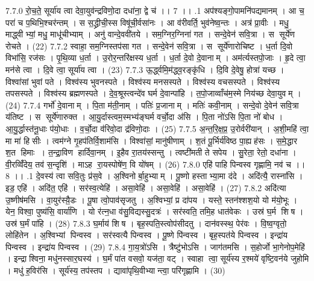 7.7.0
रो॒च॒ते॒ सूर्या॑य त्वा देवा॒युव॑न्द्रविणो॒दा दधा॑ना॒ द्वे च॑ ।। 7 ।।
.1
अप॑श्यङ्गो॒पामनि॑पद्यमानम् । आ च॒ परा॑ च प॒थिभि॒श्चर॑न्तम् । स स॒द्ध्रीची॒स्स विषू॑ची॒र्वसा॑नः । आ व॑रीवर्ति॒ भुव॑नेष्व॒न्तः । अत्र॑ प्रा॒वीः । मधु॒ माद्ध्वीभ्यां॒ मधु॒ माधू॑चीभ्याम् । अनु॑ वान्दे॒ववी॑तये । सम॒ग्निर॒ग्निना॑ गत । सन्दे॒वेन॑ सवि॒त्रा । स सूर्ये॑ण रोचते । (22)
7.7.2
स्वाहा॒ सम॒ग्निस्तप॑सा गत । सन्दे॒वेन॑ सवि॒त्रा । स सूर्ये॑णारोचिष्ट । ध॒र्ता दि॒वो विभा॑सि॒ रज॑सः । पृ॒थि॒व्या ध॒र्ता । उ॒रोर॒न्तरि॑क्षस्य ध॒र्ता । ध॒र्ता दे॒वो दे॒वानाम् । अम॑र्त्यस्तपो॒जाः । हृ॒दे त्वा॒ मन॑से त्वा । दि॒वे त्वा॒ सूर्या॑य त्वा । (23)
7.7.3
ऊ॒र्द्ध्वमि॒म॑द्ध्व॒रङ्कृ॑धि । दि॒वि दे॒वेषु॒ होत्रा॑ यच्छ । विश्वा॑सां भुवां पते । विश्व॑स्य भुवनस्पते । विश्व॑स्य मनसस्पते । विश्व॑स्य वचसस्पते । विश्व॑स्य तपसस्पते । विश्व॑स्य ब्रह्मणस्पते । दे॒व॒श्रूस्त्वन्दे॑व घर्म दे॒वान्पा॑हि । त॒पो॒जाव्वाँच॑म॒स्मे निय॑च्छ देवा॒युवम् । (24)
7.7.4
गर्भो॑ दे॒वानाम् । पि॒ता म॑ती॒नाम् । पतिः॑ प्र॒जानाम् । मतिः॑ कवी॒नाम् । सन्दे॒वो दे॒वेन॑ सवि॒त्रा य॑तिष्ट । स सूर्ये॑णारुक्त । आ॒यु॒र्दास्त्वम॒स्मभ्य॑ङ्घर्म वर्चो॒दा अ॑सि । पि॒ता नो॑ऽसि पि॒ता नो॑ बोध । आ॒यु॒र्द्धास्त॑नू॒धाः प॑यो॒धाः । व॒र्चो॒दा व॑रिवो॒दा द्र॑विणो॒दाः । (25)
7.7.5
अ॒न्त॒रि॒क्ष॒प्र॒ उ॒रोर्वरी॑यान् । अ॒शी॒महि॑ त्वा॒ मा मा॑ हिसीः । त्वम॑ग्ने गृ॒हप॑तिर्वि॒शाम॑सि । विश्वा॑सां॒ मानु॑षीणाम् । श॒तं पू॒र्भिर्य॑विष्ठ पा॒ह्यह॑सः । स॒मे॒द्धार श॒त हिमाः । त॒न्द्रा॒विण हार्दिवा॒नम् । इ॒हैव रा॒तय॑स्सन्तु । त्वष्टी॑मती ते सपेय । सु॒रेता॒ रेतो॒ दधा॑ना । वी॒रव्विँ॑देय॒ तव॑ स॒न्दृशि॑ । माऽह रा॒यस्पोषे॑ण॒ वि यो॑षम् । (26)
7.8.0
एहि॑ पाहि पिन्वस्व गृह्णामि॒ नव॑ च ।। 8 ।।
.1
दे॒वस्य॑ त्वा सवि॒तुः प्र॑स॒वे । अ॒श्विनोर्बा॒हुभ्याम् । पू॒ष्णो हस्ताभ्या॒मा द॑दे । अदि॑त्यै॒ रास्ना॑सि । इड॒ एहि॑ । अदि॑त॒ एहि॑ । सर॑स्व॒त्येहि॑ । असा॒वेहि॑ । असा॒वेहि॑ । असा॒वेहि॑ । (27)
7.8.2
अदि॑त्या उ॒ष्णीष॑मसि । वा॒युर॑स्यै़॒डः । पू॒षा त्वो॒पाव॑सृजतु । अ॒श्विभ्यां॒ प्र दा॑पय । यस्ते॒ स्तन॑श्शश॒यो यो म॑यो॒भूः । येन॒ विश्वा॒ पुष्य॑सि॒ वार्या॑णि । यो र॑त्न॒धा व॑सु॒विद्यस्सु॒दत्रः॑ । सर॑स्वति॒ तमि॒ह धात॑वेकः । उस्र॑ घ॒र्म शिष । उस्र॑ घ॒र्मं पा॑हि । (28)
7.8.3
घ॒र्माय॑ शिष । बृह॒स्पति॒स्त्वोप॑सीदतु । दान॑वस्स्थ॒ पेर॑वः । वि॒ष्व॒ग्वृतो॒ लोहि॑तेन । अ॒श्विभ्यां पिन्वस्व । सर॑स्वत्यै पिन्वस्व । पू॒ष्णे पि॑न्वस्व । बृह॒स्पत॑ये पिन्वस्व । इन्द्रा॑य पिन्वस्व । इन्द्रा॑य पिन्वस्व । (29)
7.8.4
गा॒य॒त्रो॑ऽसि । त्रैष्टु॑भोऽसि । जाग॑तमसि । स॒होर्जो भा॒गेनोप॒मेहि॑ । इन्द्राश्विना॒ मधु॑नस्सार॒घस्य॑ । घ॒र्मं पा॑त वसवो॒ यज॑ता॒ वट् । स्वाहा त्वा॒ सूर्य॑स्य र॒श्मये॑ वृष्टि॒वन॑ये जुहोमि । मधु॑ ह॒विर॑सि । सूर्य॑स्य॒ तप॑स्तप । द्यावा॑पृथि॒वीभ्यान्त्वा॒ परि॑गृह्णामि । (30)
